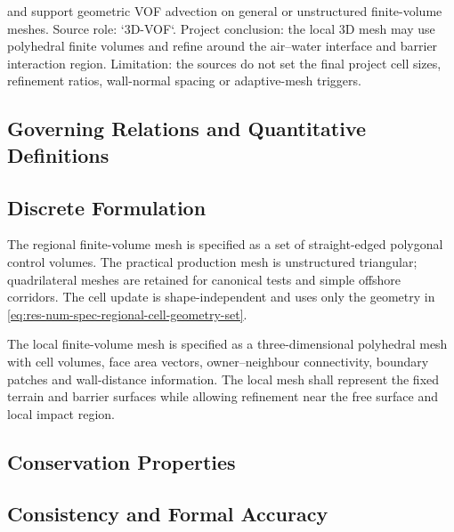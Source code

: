 \textcite{roenby2016computational} and \textcite{maric2013vofoam}
support geometric VOF advection on general or unstructured
finite-volume meshes. Source role: `3D-VOF`. Project conclusion: the
local 3D mesh may use polyhedral finite volumes and refine around the
air--water interface and barrier interaction region. Limitation: the
sources do not set the final project cell sizes, refinement ratios,
wall-normal spacing or adaptive-mesh triggers.

\subsection{Governing Relations and Quantitative Definitions}
\label{sec:res-num-msh-governing-relations}

%

\subsection{Discrete Formulation}
\label{sec:res-num-msh-discrete-formulation}

The regional finite-volume mesh is specified as a set of straight-edged
polygonal control volumes. The practical production mesh is unstructured
triangular; quadrilateral meshes are retained for canonical tests and
simple offshore corridors. The cell update is shape-independent and uses
only the geometry in
\cref{eq:res-num-spec-regional-cell-geometry-set}.

The local finite-volume mesh is specified as a three-dimensional
polyhedral mesh with cell volumes, face area vectors, owner--neighbour
connectivity, boundary patches and wall-distance information. The local
mesh shall represent the fixed terrain and barrier surfaces while
allowing refinement near the free surface and local impact region.

\subsection{Conservation Properties}
\label{sec:res-num-msh-conservation-properties}


\subsection{Consistency and Formal Accuracy}
\label{sec:res-num-msh-consistency-formal-accuracy}

